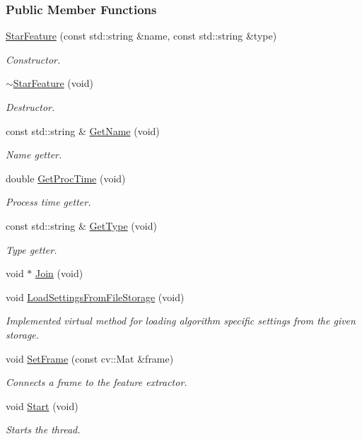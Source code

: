 \subsubsection*{Public Member Functions}
\begin{DoxyCompactItemize}
\item 
\hyperlink{group___feature_extractor_a3b162000e9fa1ddbaa296c362d696af9}{Star\-Feature} (const std\-::string \&name, const std\-::string \&type)
\begin{DoxyCompactList}\small\item\em Constructor. \end{DoxyCompactList}\item 
\hyperlink{group___feature_extractor_a1f06b1c6af33b303a608828db923cb8c}{$\sim$\-Star\-Feature} (void)
\begin{DoxyCompactList}\small\item\em Destructor. \end{DoxyCompactList}\item 
const std\-::string \& \hyperlink{group___feature_extractor_a5f69ca2455d5eec4493dbf115d00d5c9}{Get\-Name} (void)
\begin{DoxyCompactList}\small\item\em Name getter. \end{DoxyCompactList}\item 
double \hyperlink{group___feature_extractor_ad07a3104192b50d911eee634a0be009d}{Get\-Proc\-Time} (void)
\begin{DoxyCompactList}\small\item\em Process time getter. \end{DoxyCompactList}\item 
const std\-::string \& \hyperlink{group___feature_extractor_a6724c19006d495bd6a9c8c6029236ebc}{Get\-Type} (void)
\begin{DoxyCompactList}\small\item\em Type getter. \end{DoxyCompactList}\item 
void $\ast$ \hyperlink{group___core_a8f33f7750321d5df9188033e7e3e300d}{Join} (void)
\item 
void \hyperlink{group___feature_extractor_a0a46cb80a6a4d45e324757b4ef679e81}{Load\-Settings\-From\-File\-Storage} (void)
\begin{DoxyCompactList}\small\item\em Implemented virtual method for loading algorithm specific settings from the given storage. \end{DoxyCompactList}\item 
void \hyperlink{group___feature_extractor_a3c58d995fb2440b28db3b21b54b94815}{Set\-Frame} (const cv\-::\-Mat \&frame)
\begin{DoxyCompactList}\small\item\em Connects a frame to the feature extractor. \end{DoxyCompactList}\item 
void \hyperlink{group___core_a2b42f82341afd2747ea093b6ac8b91cb}{Start} (void)
\begin{DoxyCompactList}\small\item\em Starts the thread. \end{DoxyCompactList}\end{DoxyCompactItemize}
